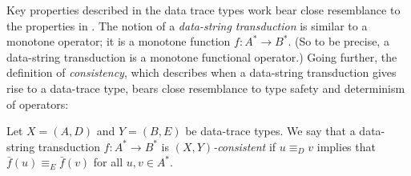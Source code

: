 Key properties described in the data trace types work bear close resemblance to the properties in .
The notion of a \emph{data-string transduction} is similar to a monotone operator; it is a monotone function $f: A^* \to B^*$. (So to be precise, a data-string transduction is a monotone functional operator.)
Going further, the definition of \emph{consistency}, which describes when a data-string transduction gives rise to a data-trace type, bears close resemblance to type safety and determinism of operators:

\begin{definition}[Consistency]
Let $X = (A,D)$ and $Y = (B,E)$ be data-trace types. We say that a data-string transduction $f: A^* \to B^*$
is \emph{$(X,Y)$-consistent} if $u \equiv_D v$ implies that $\bar{f}(u) \equiv_{E} \bar{f}(v)$ for all $u, v \in A^*$.
\end{definition}
